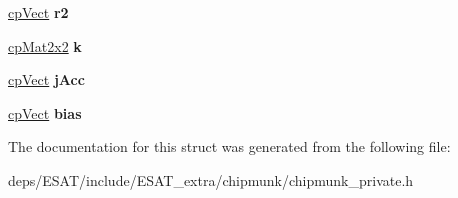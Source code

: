 \begin{DoxyCompactItemize}
\item 
\mbox{\label{structcp_groove_joint_ad0dcb895562c9f33f0e13a27fb079800}} 
\mbox{\hyperlink{structcp_vect}{cp\+Vect}} {\bfseries r2}
\item 
\mbox{\label{structcp_groove_joint_abf71a39fc1198bc6cc62d11ea5f68af4}} 
\mbox{\hyperlink{structcp_mat2x2}{cp\+Mat2x2}} {\bfseries k}
\item 
\mbox{\label{structcp_groove_joint_a208102ecfa8a5096311acd126762f82c}} 
\mbox{\hyperlink{structcp_vect}{cp\+Vect}} {\bfseries j\+Acc}
\item 
\mbox{\label{structcp_groove_joint_a33a40d28da62cc7bbd74fc3bfa68f0bf}} 
\mbox{\hyperlink{structcp_vect}{cp\+Vect}} {\bfseries bias}
\end{DoxyCompactItemize}


The documentation for this struct was generated from the following file\+:\begin{DoxyCompactItemize}
\item 
deps/\+E\+S\+A\+T/include/\+E\+S\+A\+T\+\_\+extra/chipmunk/chipmunk\+\_\+private.\+h\end{DoxyCompactItemize}
